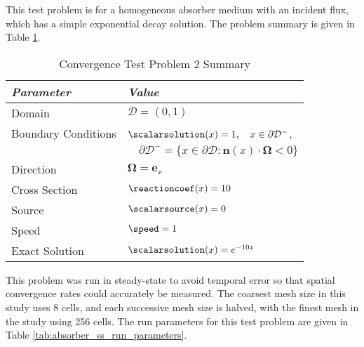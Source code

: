 This test problem is for a homogeneous absorber medium with an incident
flux, which has a simple exponential decay solution.
The problem summary is given in Table \ref{tab:absorber}.

\begin{table}[htb]\caption{Convergence Test Problem 2 Summary}
\label{tab:absorber}
\centering
\begin{tabular}{l l}\toprule
\emph{Parameter} & \emph{Value}\\\midrule
Domain & $\mathcal{D} = (0,1)$\\
Boundary Conditions & $\scalarsolution(x)=1,\quad x\in\partial\mathcal{D}^-$,\\
   & $\quad\partial\mathcal{D}^-=\{x\in\partial\mathcal{D}:\mathbf{n}(x)
       \cdot\mathbf{\Omega}<0\}$\\
Direction & $\mathbf{\Omega} = \mathbf{e}_x$\\
Cross Section & $\reactioncoef(x)=10$\\
Source & $\scalarsource(x)=0$\\
Speed & $\speed=1$\\
Exact Solution & $\scalarsolution(x)=e^{-10x}$\\
\bottomrule\end{tabular}
\end{table}

This problem was run in steady-state to avoid temporal error so that spatial
convergence rates could accurately be measured.
The coarsest mesh size in this study uses 8 cells, and each successive mesh
size is halved, with the finest mesh in the study using 256 cells.
The run parameters for this test problem are given in Table
\ref{tab:absorber_ss_run_parameters}.

